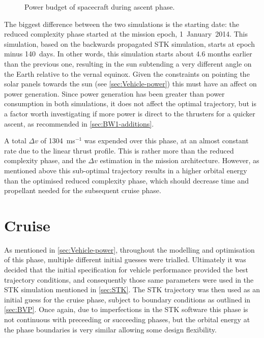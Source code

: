 \begin{figure}
\caption{Power budget of spacecraft during ascent phase.}
\label{fig:Ascent-energy}
\centering
\def\svgwidth{\figurewidth}

\end{figure}

The biggest difference between the two simulations is the starting date: the reduced complexity phase started at the mission epoch, 1~January~2014. This simulation, based on the backwards propagated STK simulation, starts at epoch minus 140~days. In other words, this simulation starts about 4.6 months earlier than the previous one, resulting in the sun subtending a very different angle on the Earth relative to the vernal equinox. Given the constraints on pointing the solar panels towards the sun (see \autoref{sec:Vehicle-power}) this must have an affect on power generation. Since power generation has been greater than power consumption in both simulations, it does not affect the optimal trajectory, but is a factor worth investigating if more power is direct to the thrusters for a quicker ascent, as recommended in \autoref{sec:BW1-additions}.

A total $\Delta v$ of 1304~ms$^{-1}$ was expended over this phase, at an almost constant rate due to the linear thrust profile. This is rather more than the reduced complexity phase, and the $\Delta v$ estimation in the mission architecture. However, as mentioned above this sub-optimal trajectory results in a higher orbital energy than the optimised reduced complexity phase, which should decrease time and propellant needed for the subsequent cruise phase.



\clearpage


\section{Cruise} \label{sec:Cruise}
As mentioned in \autoref{sec:Vehicle-power}, throughout the modelling and optimisation of this phase, multiple different initial guesses were trialled. Ultimately it was decided that the initial specification for vehicle performance provided the best trajectory conditions, and consequently those same parameters were used in the STK simulation mentioned in \autoref{sec:STK}. The STK trajectory was then used as an initial guess for the cruise phase, subject to boundary conditions as outlined in \autoref{sec:BVP}. Once again, due to imperfections in the STK software this phase is not continuous with preceeding or succeeding phases, but the orbital energy at the phase boundaries is very similar allowing some design flexibility.

